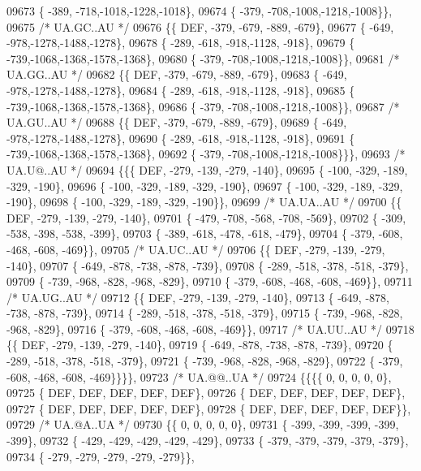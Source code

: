 \begin{DoxyCode}
09673 \{ -389, -718,-1018,-1228,-1018\},
09674 \{ -379, -708,-1008,-1218,-1008\}\},
09675 \textcolor{comment}{/* UA.GC..AU */}
09676 \{\{  DEF, -379, -679, -889, -679\},
09677 \{ -649, -978,-1278,-1488,-1278\},
09678 \{ -289, -618, -918,-1128, -918\},
09679 \{ -739,-1068,-1368,-1578,-1368\},
09680 \{ -379, -708,-1008,-1218,-1008\}\},
09681 \textcolor{comment}{/* UA.GG..AU */}
09682 \{\{  DEF, -379, -679, -889, -679\},
09683 \{ -649, -978,-1278,-1488,-1278\},
09684 \{ -289, -618, -918,-1128, -918\},
09685 \{ -739,-1068,-1368,-1578,-1368\},
09686 \{ -379, -708,-1008,-1218,-1008\}\},
09687 \textcolor{comment}{/* UA.GU..AU */}
09688 \{\{  DEF, -379, -679, -889, -679\},
09689 \{ -649, -978,-1278,-1488,-1278\},
09690 \{ -289, -618, -918,-1128, -918\},
09691 \{ -739,-1068,-1368,-1578,-1368\},
09692 \{ -379, -708,-1008,-1218,-1008\}\}\},
09693 \textcolor{comment}{/* UA.U@..AU */}
09694 \{\{\{  DEF, -279, -139, -279, -140\},
09695 \{ -100, -329, -189, -329, -190\},
09696 \{ -100, -329, -189, -329, -190\},
09697 \{ -100, -329, -189, -329, -190\},
09698 \{ -100, -329, -189, -329, -190\}\},
09699 \textcolor{comment}{/* UA.UA..AU */}
09700 \{\{  DEF, -279, -139, -279, -140\},
09701 \{ -479, -708, -568, -708, -569\},
09702 \{ -309, -538, -398, -538, -399\},
09703 \{ -389, -618, -478, -618, -479\},
09704 \{ -379, -608, -468, -608, -469\}\},
09705 \textcolor{comment}{/* UA.UC..AU */}
09706 \{\{  DEF, -279, -139, -279, -140\},
09707 \{ -649, -878, -738, -878, -739\},
09708 \{ -289, -518, -378, -518, -379\},
09709 \{ -739, -968, -828, -968, -829\},
09710 \{ -379, -608, -468, -608, -469\}\},
09711 \textcolor{comment}{/* UA.UG..AU */}
09712 \{\{  DEF, -279, -139, -279, -140\},
09713 \{ -649, -878, -738, -878, -739\},
09714 \{ -289, -518, -378, -518, -379\},
09715 \{ -739, -968, -828, -968, -829\},
09716 \{ -379, -608, -468, -608, -469\}\},
09717 \textcolor{comment}{/* UA.UU..AU */}
09718 \{\{  DEF, -279, -139, -279, -140\},
09719 \{ -649, -878, -738, -878, -739\},
09720 \{ -289, -518, -378, -518, -379\},
09721 \{ -739, -968, -828, -968, -829\},
09722 \{ -379, -608, -468, -608, -469\}\}\}\},
09723 \textcolor{comment}{/* UA.@@..UA */}
09724 \{\{\{\{    0,    0,    0,    0,    0\},
09725 \{  DEF,  DEF,  DEF,  DEF,  DEF\},
09726 \{  DEF,  DEF,  DEF,  DEF,  DEF\},
09727 \{  DEF,  DEF,  DEF,  DEF,  DEF\},
09728 \{  DEF,  DEF,  DEF,  DEF,  DEF\}\},
09729 \textcolor{comment}{/* UA.@A..UA */}
09730 \{\{    0,    0,    0,    0,    0\},
09731 \{ -399, -399, -399, -399, -399\},
09732 \{ -429, -429, -429, -429, -429\},
09733 \{ -379, -379, -379, -379, -379\},
09734 \{ -279, -279, -279, -279, -279\}\},

\end{DoxyCode}
